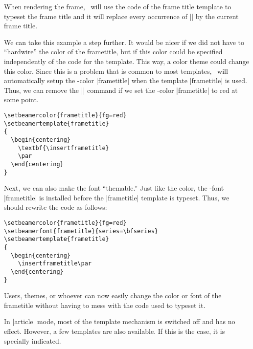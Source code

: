 When rendering the frame, \beamer\ will use the code of the frame title template to typeset the frame title and it will replace every occurrence of |\insertframetitle| by the current frame title.

We can take this example a step further. It would be nicer if we did not have to ``hardwire'' the color of the frametitle, but if this color could be specified independently of the code for the template. This way, a color theme could change this color. Since this is a problem that is common to most templates, \beamer\ will automatically setup the \beamer-color |frametitle| when the template |frametitle| is used. Thus, we can remove the |\color{red}| command if we set the \beamer-color |frametitle| to red at some point.

\begin{verbatim}
\setbeamercolor{frametitle}{fg=red}
\setbeamertemplate{frametitle}
{
  \begin{centering}
    \textbf{\insertframetitle}
    \par
  \end{centering}
}
\end{verbatim}

Next, we can also make the font ``themable.'' Just like the color, the \beamer-font |frametitle| is installed before the |frametitle| template is typeset. Thus, we should rewrite the code as follows:

\begin{verbatim}
\setbeamercolor{frametitle}{fg=red}
\setbeamerfont{frametitle}{series=\bfseries}
\setbeamertemplate{frametitle}
{
  \begin{centering}
    \insertframetitle\par
  \end{centering}
}
\end{verbatim}

Users, themes, or whoever can now easily change the color or font of the frametitle without having to mess with the code used to typeset it.

\articlenote
In |article| mode, most of the template mechanism is switched off and has no effect. However, a few templates are also available. If this is the case, it is specially indicated.
\smallskip

